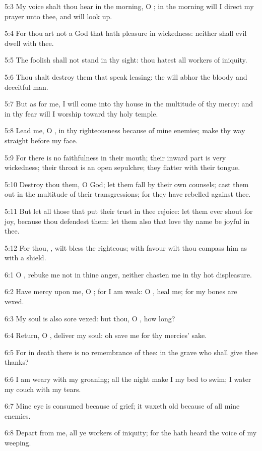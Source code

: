 5:3 My voice shalt thou hear in the morning, O \LORD; in the morning will I direct my prayer unto thee, and will look up.

5:4 For thou art not a God that hath pleasure in wickedness: neither shall evil dwell with thee.

5:5 The foolish shall not stand in thy sight: thou hatest all workers of iniquity.

5:6 Thou shalt destroy them that speak leasing: the \LORD will abhor the bloody and deceitful man.

5:7 But as for me, I will come into thy house in the multitude of thy mercy: and in thy fear will I worship toward thy holy temple.

5:8 Lead me, O \LORD, in thy righteousness because of mine enemies; make thy way straight before my face.

5:9 For there is no faithfulness in their mouth; their inward part is very wickedness; their throat is an open sepulchre; they flatter with their tongue.

5:10 Destroy thou them, O God; let them fall by their own counsels; cast them out in the multitude of their transgressions; for they have rebelled against thee.

5:11 But let all those that put their trust in thee rejoice: let them ever shout for joy, because thou defendest them: let them also that love thy name be joyful in thee.

5:12 For thou, \LORD, wilt bless the righteous; with favour wilt thou compass him as with a shield.



6:1 O \LORD, rebuke me not in thine anger, neither chasten me in thy hot displeasure.

6:2 Have mercy upon me, O \LORD; for I am weak: O \LORD, heal me; for my bones are vexed.

6:3 My soul is also sore vexed: but thou, O \LORD, how long?

6:4 Return, O \LORD, deliver my soul: oh save me for thy mercies' sake.

6:5 For in death there is no remembrance of thee: in the grave who shall give thee thanks?

6:6 I am weary with my groaning; all the night make I my bed to swim; I water my couch with my tears.

6:7 Mine eye is consumed because of grief; it waxeth old because of all mine enemies.

6:8 Depart from me, all ye workers of iniquity; for the \LORD hath heard the voice of my weeping.

